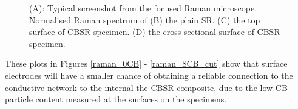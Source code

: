 \begin{figure}[H]
\begin{minipage}[t]{.45\textwidth}
{		}
	\end{minipage}
    \begin{minipage}[t]{.45\textwidth}
    	\centering
		\vfill
	\end{minipage}
	\caption{(A): Typical screenshot from the focused Raman microscope. Normalised Raman spectrum of (B) the plain SR. (C) the top surface of CBSR specimen. (D) the cross-sectional surface of CBSR specimen.}
	\label{fig:Raman_CB_SR}
\end{figure}
These plots in Figures \ref{raman_0CB} - \ref{raman_8CB_cut} show that surface electrodes will have a smaller chance of obtaining a reliable connection to the conductive network to the internal the CBSR composite, due to the low CB particle content measured at the surfaces on the specimens.

